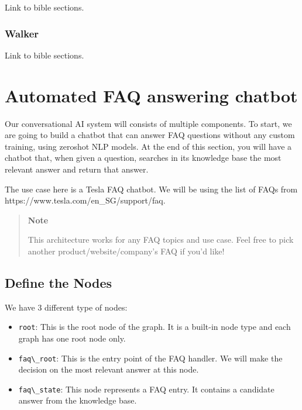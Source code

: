 Link to bible sections.

\hypertarget{walker}{%
\subsubsection{Walker}\label{walker}}

Link to bible sections.

\hypertarget{automated-faq-answering-chatbot}{%
\section{Automated FAQ answering
chatbot}\label{automated-faq-answering-chatbot}}

Our conversational AI system will consists of multiple components. To
start, we are going to build a chatbot that can answer FAQ questions
without any custom training, using zeroshot NLP models. At the end of
this section, you will have a chatbot that, when given a question,
searches in its knowledge base the most relevant answer and return that
answer.

The use case here is a Tesla FAQ chatbot. We will be using the list of
FAQs from https://www.tesla.com/en\_SG/support/faq.

\begin{quote}
\textbf{Note}

This architecture works for any FAQ topics and use case. Feel free to
pick another product/website/company's FAQ if you'd like!
\end{quote}

\hypertarget{define-the-nodes}{%
\subsection{Define the Nodes}\label{define-the-nodes}}

We have 3 different type of nodes:

\begin{itemize}
\tightlist
\item
  \passthrough{\lstinline!root!}: This is the root node of the graph. It
  is a built-in node type and each graph has one root node only.
\item
  \passthrough{\lstinline!faq\_root!}: This is the entry point of the
  FAQ handler. We will make the decision on the most relevant answer at
  this node.
\item
  \passthrough{\lstinline!faq\_state!}: This node represents a FAQ
  entry. It contains a candidate answer from the knowledge base.
\end{itemize}

